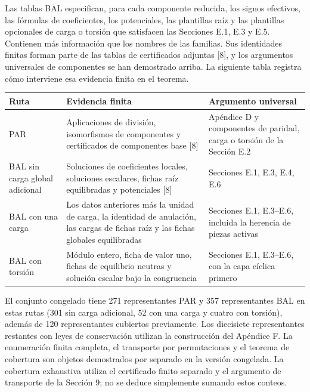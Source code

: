 \documentclass[spanish,11pt,a4paper]{article}
\begin{document}
Las tablas BAL especifican, para cada componente reducida, los signos efectivos, las fórmulas de coeficientes, los potenciales, las plantillas raíz y las plantillas opcionales de carga o torsión que satisfacen las Secciones E.1, E.3 y E.5. Contienen más información que los nombres de las familias. Sus identidades finitas forman parte de las tablas de certificados adjuntas {[}8{]}, y los argumentos universales de componentes se han demostrado arriba. La siguiente tabla registra cómo interviene esa evidencia finita en el teorema.

{\begin{longtable}[]{@{}
  >{\raggedright\arraybackslash}p{}
  >{\raggedright\arraybackslash}p{}
  >{\raggedright\arraybackslash}p{}@{}}
\toprule\noalign{}
\begin{minipage}[b]{\linewidth}\raggedright
Ruta
\end{minipage} & \begin{minipage}[b]{\linewidth}\raggedright
Evidencia finita
\end{minipage} & \begin{minipage}[b]{\linewidth}\raggedright
Argumento universal
\end{minipage} \\
\midrule\noalign{}
\endhead
\bottomrule\noalign{}
\endlastfoot
PAR & Aplicaciones de división, isomorfismos de componentes y certificados de componentes base {[}8{]} & Apéndice D y componentes de paridad, carga o torsión de la Sección E.2 \\
BAL sin carga global adicional & Soluciones de coeficientes locales, soluciones escalares, fichas raíz equilibradas y potenciales {[}8{]} & Secciones E.1, E.3, E.4, E.6 \\
BAL con una carga & Los datos anteriores más la unidad de carga, la identidad de anulación, las cargas de fichas raíz y las fichas globales equilibradas & Secciones E.1, E.3--E.6, incluida la herencia de piezas activas \\
BAL con torsión & Módulo entero, ficha de valor uno, fichas de equilibrio neutras y solución escalar bajo la congruencia & Secciones E.1, E.3--E.6, con la capa cíclica primero \\
\end{longtable}
}

El conjunto congelado tiene 271 representantes PAR y 357 representantes BAL en estas rutas (301 sin carga adicional, 52 con una carga y cuatro con torsión), además de 120 representantes cubiertos previamente. Los diecisiete representantes restantes con leyes de conservación utilizan la construcción del Apéndice F. La enumeración finita completa, el transporte por permutaciones y el teorema de cobertura son objetos demostrados por separado en la versión congelada. La cobertura exhaustiva utiliza el certificado finito separado y el argumento de transporte de la Sección 9; no se deduce simplemente sumando estos conteos.
\end{document}
